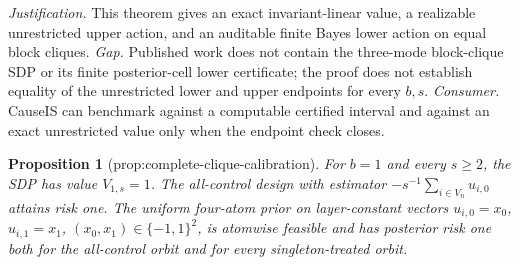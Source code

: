 \documentclass{article}
\newtheorem{proposition}{Proposition}
\begin{document}
\par\smallskip\noindent \textit{Justification.} This theorem gives an exact invariant-linear value, a realizable unrestricted upper action, and an auditable finite Bayes lower action on equal block cliques. \textit{Gap.} Published work does not contain the three-mode block-clique SDP or its finite posterior-cell lower certificate; the proof does not establish equality of the unrestricted lower and upper endpoints for every \(b,s\). \textit{Consumer.} CauseIS can benchmark against a computable certified interval and against an exact unrestricted value only when the endpoint check closes.

\begin{proposition}[prop:complete-clique-calibration]\label{prop:complete-clique-calibration}
For \(b=1\) and every \(s\ge2\), the SDP has value \(V_{1,s}=1\). The all-control design with estimator \(-s^{-1}\sum_{i\in V_n}u_{i,0}\) attains risk one. The uniform four-atom prior on layer-constant vectors \(u_{i,0}=x_0\), \(u_{i,1}=x_1\), \((x_0,x_1)\in\{-1,1\}^2\), is atomwise feasible and has posterior risk one both for the all-control orbit and for every singleton-treated orbit.
\end{proposition}
\end{document}
